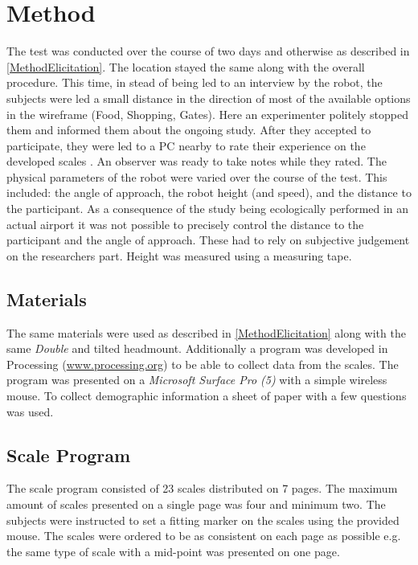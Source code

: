 \section{Method}
\label{Method2}
The test was conducted over the course of two days and otherwise as described in \autoref{MethodElicitation}. The location stayed the same along with the overall procedure. This time, in stead of being led to an interview by the robot, the subjects were led a small distance in the direction of most of the available options in the wireframe (Food, Shopping, Gates). Here an experimenter politely stopped them and informed them about the ongoing study. After they accepted to participate, they were led to a PC nearby to rate their experience on the developed scales . An observer was ready to take notes while they rated. The physical parameters of the robot were varied over the course of the test. This included: the angle of approach, the robot height (and speed), and the distance to the participant. As a consequence of the study being ecologically performed in an actual airport it was not possible to precisely control the distance to the participant and the angle of approach. These had to rely on subjective judgement on the researchers part. Height was measured using a measuring tape.

\subsection{Materials}
The same materials were used as described in \autoref{MethodElicitation} along with the same \textit{Double} and tilted headmount.  Additionally a program  was developed in Processing (\url{www.processing.org}) to be able to collect data from the scales. The program was presented on a \textit{Microsoft Surface Pro (5)} with a simple wireless mouse. To collect demographic information a sheet of paper with a few questions was used.

\subsection{Scale Program}
The scale program consisted of 23 scales distributed on 7 pages. The maximum amount of scales presented on a single page was four and minimum two. The subjects were instructed to set a fitting marker on the scales using the provided mouse. The scales were ordered to be as consistent on each page as possible e.g. the same type of scale with a mid-point was presented on one page.


